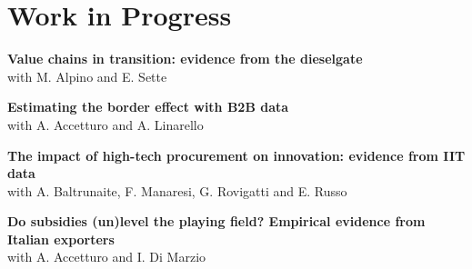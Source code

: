 \documentclass[11pt,a4paper]{article}
\begin{document}
\section*{Work in Progress}
\noindent\begin{minipage}{\linewidth}
\textbf{Value chains in transition: evidence from the dieselgate}\\
with M. Alpino and E. Sette
\end{minipage}\par\medskip
\noindent\begin{minipage}{\linewidth}
\textbf{Estimating the border effect with B2B data}\\
with A. Accetturo and A. Linarello
\end{minipage}\par\medskip
\noindent\begin{minipage}{\linewidth}
\textbf{The impact of high-tech procurement on innovation: evidence from IIT data}\\
with A. Baltrunaite, F. Manaresi, G. Rovigatti and E. Russo
\end{minipage}\par\medskip
\noindent\begin{minipage}{\linewidth}
\textbf{Do subsidies (un)level the playing field? Empirical evidence from Italian exporters}\\
with A. Accetturo and I. Di Marzio
\end{minipage}\par\medskip
\end{document}
